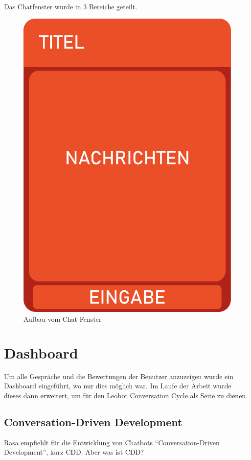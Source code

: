 Das Chatfenster wurde in 3 Bereiche geteilt.

\begin{figure}[hbt!]
    \centering
    \includegraphics[scale=0.2]{pics/chatWidgetStructure}
    \caption{Aufbau vom Chat Fenster}
    \label{fig:impl:chatWidget}
\end{figure}


\section{Dashboard}\label{sec:dashboard}

Um alle Gespräche und die Bewertungen der Benutzer anzuzeigen wurde ein Dashboard eingeführt, wo nur dies möglich war.
Im Laufe der Arbeit wurde dieses dann erweitert, um für den Leobot Conversation Cycle als Seite zu dienen.

\subsection{Conversation-Driven Development}\label{cdd}
Rasa empfiehlt für die Entwicklung von Chatbots ``Conversation-Driven Development'', kurz CDD.\cite{cdd}
Aber was ist CDD?

